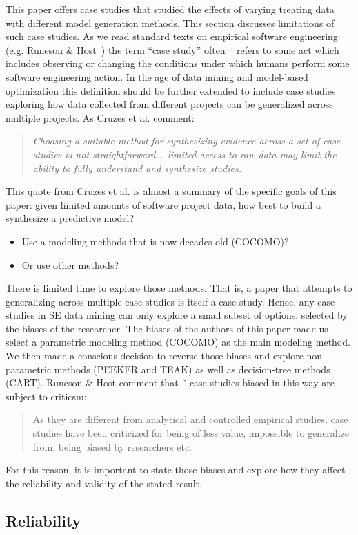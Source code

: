 \documentclass[smallcondesed]{svjour3}
\newcommand{\bi}{\begin{itemize}[leftmargin=0.4cm]}
\newcommand{\ei}{\end{itemize}}
\begin{document}
This paper offers case studies  that studied the effects of varying
treating data with different model generation methods.
This section discusses
limitations of such case studies.
As we read standard texts on empirical software engineering
(e.g. Runeson & Host~\cite{Runeson200874}) the term ``case study'' often ¨
refers to some act which includes observing or changing
the conditions under which humans perform some software
engineering action. In the age of data mining and model-based
optimization this definition should be further extended
to include case studies exploring how data collected from
different projects can be generalized across multiple projects.
As Cruzes et al. comment:
\begin{quote}
{\em   Choosing a suitable method for synthesizing evidence
across a set of case studies is not straightforward...
limited access to raw data may limit the ability
to fully understand and synthesize studies. ~\cite{c75}}
\end{quote}
This quote from Cruzes et al. is almost a summary of the
specific goals of this paper: given limited amounts of software
project data, how best to build a synthesize a predictive model?
\bi
\item Use a modeling methods that is now decades old (COCOMO)?
\item Or use other methods?
  \ei
  There is limited time to explore those methods.
That is, a paper that attempts to generalizing across multiple
case studies is itself a case study. Hence, any case studies
in SE data mining  can only explore a small
subset of options, selected by the biases of the researcher. The
biases of the authors of this paper made us select
a parametric modeling method (COCOMO)  as the main modeling method.
We then made a conscious decision to reverse those biases
and explore non-parametric methods (PEEKER and TEAK) as well
as decision-tree methods (CART). Runeson \& Host comment that ¨
case studies biased in this way are subject to criticsm:
\begin{quote}
As they are different from analytical and controlled
empirical studies, case studies have been criticized
for being of less value, impossible to generalize
from, being biased by researchers etc.
\end{quote}
For this reason, it is important to state those biases and explore
how they affect the reliability and validity of the stated result.

\subsection{Reliability}
\end{document}
